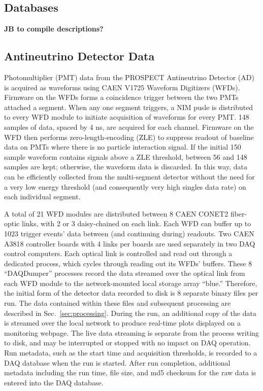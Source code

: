 

\subsection{Databases}

\textbf{JB to compile descriptions?}

\subsection{Antineutrino Detector Data}

Photomultiplier (PMT) data from the PROSPECT Antineutrino Detector (AD) is acquired as waveforms using CAEN V1725 Waveform Digitizers (WFDs).
Firmware on the WFDs forms a coincidence trigger between the two PMTs attached a segment. 
When any one segment triggers, a NIM pusle is distributed to every WFD module to initiate acquisition of waveforms for every PMT. 
148 samples of data, spaced by 4 ns, are acquired for each channel.
Firmware on the WFD then performs zero-length-encoding (ZLE) to suppress readout of baseline data on PMTs where there is no particle interaction signal.
If the initial 150 sample waveform contains signals above a ZLE threshold, between 56 and 148 samples are kept; otherwise, the waveform data is discarded.
In this way, data can be efficiently collected from the multi-segment detector without the need for a very low energy threshold (and consequently very high singles data rate) on each individual segment.

A total of 21 WFD modules are distributed between 8 CAEN CONET2 fiber-optic links, with 2 or 3 daisy-chained on each link.
Each WFD can buffer up to 1023 trigger events' data between (and continuing during) readouts.
Two CAEN A3818 controller boards with 4 links per boards are used separately in two DAQ control computers.  
Each optical link is controlled and read out through a dedicated process, which cycles through reading out its WFDs' buffers.
These 8 ``DAQDumper'' processes record the data streamed over the optical link from each WFD module to the network-mounted local storage array ``blue.''
Therefore, the initial form of the detector data recorded to disk is 8 separate binary files per run.
The data contained within these files and subsequent processing are described in Sec.~\ref{sec:processing}.
During the run, an additional copy of the data is streamed over the local network to produce real-time plots displayed on a monitoring webpage.
The live data streaming is separate from the process writing to disk, and may be interrupted or stopped with no impact on DAQ operation.
Run metadata, such as the start time and acquisition thresholds, is recorded to a DAQ database when the run is started.
After run completion, additional metadata including the run time, file size, and md5 checksum for the raw data is entered into the DAQ database.

